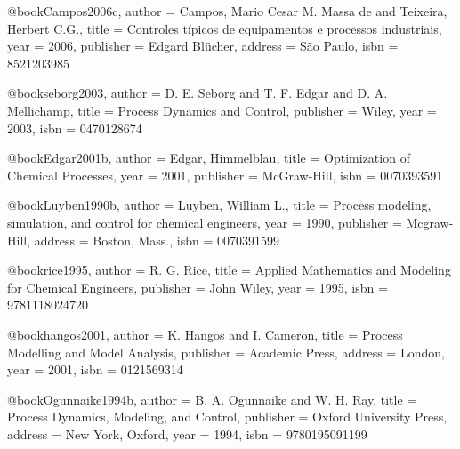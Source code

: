 @book{Campos2006c,
  author = {Campos, Mario Cesar M. Massa de and Teixeira, Herbert C.G.},
  title = {Controles típicos de equipamentos e processos industriais},
  year = {2006},
  publisher = {Edgard Blücher},
  address = {São Paulo},
  isbn = {8521203985}
}


@book{seborg2003,
  author = {D. E. Seborg and T. F. Edgar and D. A. Mellichamp},
  title = {Process Dynamics and Control},
  publisher = {Wiley},
  year = {2003},
  isbn = {0470128674}
}

@book{Edgar2001b,
  author = {Edgar, Himmelblau},
  title = {Optimization of Chemical Processes},
  year = {2001},
  publisher = {McGraw-Hill},
  isbn = {0070393591}
}

@book{Luyben1990b,
  author = {Luyben, William L.},
  title = {Process modeling, simulation, and control for chemical engineers},
  year = {1990},
  publisher = {Mcgraw-Hill},
  address = {Boston, Mass.},
  isbn = {0070391599}
}


@book{rice1995,
  author = {R. G. Rice},
  title = {Applied Mathematics and Modeling for Chemical Engineers},
  publisher = {John Wiley},
  year = {1995},
  isbn = {9781118024720}
}

@book{hangos2001,
  author = {K. Hangos and I. Cameron},
  title = {Process Modelling and Model Analysis},
  publisher = {Academic Press},
  address = {London},
  year = {2001},
  isbn = {0121569314}
}

@book{Ogunnaike1994b,
  author = {B. A. Ogunnaike and W. H. Ray},
  title = {Process Dynamics, Modeling, and Control},
  publisher = {Oxford University Press},
  address = {New York, Oxford},
  year = {1994},
  isbn = {9780195091199}
}


